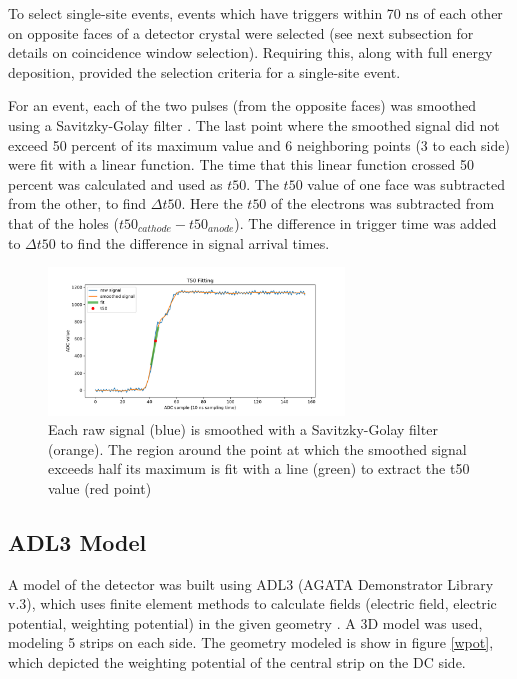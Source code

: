 To select single-site events, events which have triggers within 70 ns of each other on opposite faces of a detector crystal were selected (see next subsection for details on coincidence window selection). Requiring this, along with full energy deposition, provided the selection criteria for a single-site event.

For an event, each of the two pulses (from the opposite faces) was smoothed using a Savitzky-Golay filter \cite{scipy}. The last point where the smoothed signal did not exceed 50 percent of its maximum value and 6 neighboring points (3 to each side) were fit with a linear function. The time that this linear function crossed 50 percent was calculated and used as $t50$. The $t50$ value of one face was subtracted from the other, to find $\Delta t50$. Here the $t50$ of the electrons was subtracted from that of the holes ($t50_{cathode}- t50_{anode}$). The difference in trigger time was added to $\Delta t50$ to find the difference in signal arrival times.

\begin{figure}
\begin{centering}
\includegraphics[width=0.7\textwidth]{./figures/t50_fitting.pdf}
\caption{Each raw signal (blue) is smoothed with a Savitzky-Golay filter (orange). The region around the point at which the smoothed signal exceeds half its maximum is fit with a line (green) to extract the t50 value (red point)}
\label{fit}
\end{centering}
\end{figure}


\subsection*{ADL3 Model}

A model of the detector was built using ADL3 (AGATA Demonstrator Library v.3), which uses finite element methods to calculate fields (electric field, electric potential, weighting potential) in the given geometry \cite{adl3}. A 3D model was used, modeling 5 strips on each side. The geometry modeled is show in figure \ref{wpot}, which depicted the weighting potential of the central strip on the DC side. 

